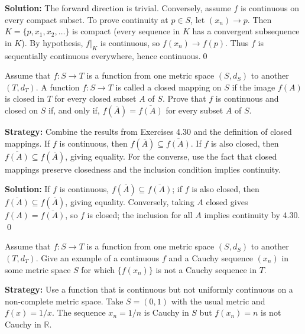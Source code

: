 \bigskip\noindent\textbf{Solution:}
The forward direction is trivial. Conversely, assume $f$ is continuous on every compact subset. To prove continuity at $p\in S$, let $(x_n)\to p$. Then $K=\{p,x_1,x_2,\ldots\}$ is compact (every sequence in $K$ has a convergent subsequence in $K$). By hypothesis, $f|_K$ is continuous, so $f(x_n)\to f(p)$. Thus $f$ is sequentially continuous everywhere, hence continuous.\qed



\begin{problembox}
\begin{problemstatement}
Assume that $f : S \rightarrow T$ is a function from one metric space $(S, d_S)$ to another $(T, d_T)$. A function $f : S \rightarrow T$ is called a closed mapping on $S$ if the image $f(A)$ is closed in $T$ for every closed subset $A$ of $S$. Prove that $f$ is continuous and closed on $S$ if, and only if, $f(\bar{A}) = \overline{f(A)}$ for every subset $A$ of $S$.
\end{problemstatement}
\end{problembox}

\noindent\textbf{Strategy:} Combine the results from Exercises 4.30 and the definition of closed mappings. If $f$ is continuous, then $f(\overline{A}) \subseteq \overline{f(A)}$. If $f$ is also closed, then $\overline{f(A)} \subseteq f(\overline{A})$, giving equality. For the converse, use the fact that closed mappings preserve closedness and the inclusion condition implies continuity.

\bigskip\noindent\textbf{Solution:}
If $f$ is continuous, $f(\overline{A})\subseteq\overline{f(A)}$; if $f$ is also closed, then $\overline{f(A)}\subseteq f(\overline{A})$, giving equality. Conversely, taking $A$ closed gives $f(A)=\overline{f(A)}$, so $f$ is closed; the inclusion for all $A$ implies continuity by 4.30. \qed



\begin{problembox}
\begin{problemstatement}
Assume that $f : S \rightarrow T$ is a function from one metric space $(S, d_S)$ to another $(T, d_T)$. Give an example of a continuous $f$ and a Cauchy sequence $(x_n)$ in some metric space $S$ for which $\{f(x_n)\}$ is not a Cauchy sequence in $T$.
\end{problemstatement}
\end{problembox}

\noindent\textbf{Strategy:} Use a function that is continuous but not uniformly continuous on a non-complete metric space. Take $S = (0,1)$ with the usual metric and $f(x) = 1/x$. The sequence $x_n = 1/n$ is Cauchy in $S$ but $f(x_n) = n$ is not Cauchy in $\mathbb{R}$.

